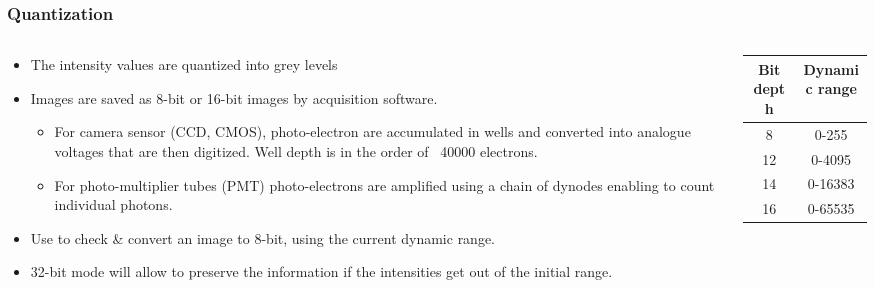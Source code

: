 \documentclass[ignorenonframetext,aspectratio=169,10pt,xcolor=table]{beamer}
\begin{document}
\begin{frame} \frametitle{Quantization}
  \begin{columns}
    \begin{column}{0.7\textwidth}
      \begin{itemize}
      \item The intensity values are quantized into grey levels
      \item Images are saved as 8-bit or 16-bit images by acquisition
        software.
        \begin{itemize}
        \item For camera sensor (CCD, CMOS), photo-electron are
          accumulated in wells and converted into analogue voltages that are
          then digitized. Well depth is in the order of ~40000 electrons.
        \item For photo-multiplier tubes (PMT) photo-electrons are
          amplified using a chain of dynodes enabling to count individual
          photons.
        \end{itemize}
      \end{itemize}
      \begin{itemize}
      \item Use  to check \& convert an image
        to 8-bit, using the current dynamic range.
      \item 32-bit mode will allow to preserve the information if the
        intensities get out of the initial range.
      \end{itemize}
    \end{column}
    \begin{column}{0.3\textwidth}
      \begin{center} \small {}
        \begin{tabular}{cc} Bit depth & Dynamic range \\ \hline 8 &
                                                                    0-255 \\ 12 & 0-4095\\ 14 & 0-16383\\ 16 & 0-65535
        \end{tabular}
      \end{center}
    \end{column}
  \end{columns}
\end{frame}
\end{document}
